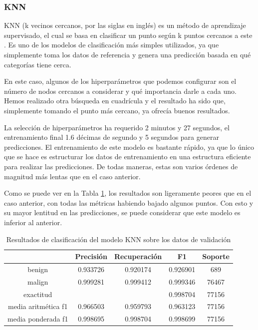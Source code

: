 \subsubsection{KNN}

KNN (k vecinos cercanos, por las siglas en inglés) es un método de aprendizaje supervisado, el cual se basa en clasificar un punto según k puntos cercanos a este \cite{ibmknn}. Es uno de los modelos de clasificación más simples utilizados, ya que simplemente toma los datos de referencia y genera una predicción basada en qué categorías tiene cerca.

En este caso, algunos de los hiperparámetros que podemos configurar son el número de nodos cercanos a considerar y qué importancia darle a cada uno. Hemos realizado otra búsqueda en cuadrícula y el resultado ha sido que, simplemente tomando el punto más cercano, ya ofrecía buenos resultados.

La selección de hiperparámetros ha requerido 2 minutos y 27 segundos, el entrenamiento final 1.6 décimas de segundo y 5 segundos para generar predicciones. El entrenamiento de este modelo es bastante rápido, ya que lo único que se hace es estructurar los datos de entrenamiento en una estructura eficiente para realizar las predicciones. De todas maneras, estas son varios órdenes de magnitud más lentas que en el caso anterior.

Como se puede ver en la Tabla \ref{table:knnresults}, los resultados son ligeramente peores que en el caso anterior, con todas las métricas habiendo bajado algunos puntos. Con esto y su mayor lentitud en las predicciones, se puede considerar que este modelo es inferior al anterior.

\begin{table}[H]
    \begin{center}
        \begin{tabular}{|c | c c c | c |} 
            \hline
            & \textbf{Precisión} & \textbf{Recuperación} & \textbf{F1}  & \textbf{Soporte} \\
            \hline
            benign               & 0.933726 & 0.920174 & 0.926901  &   689 \\
            malign               & 0.999281 & 0.999412 & 0.999346  & 76467 \\
            \hline
            exactitud            &          &          & 0.998704  & 77156 \\
            media aritmética f1  & 0.966503 & 0.959793 & 0.963123  & 77156 \\
            media ponderada f1   & 0.998695 & 0.998704 & 0.998699  & 77156 \\
            \hline
        \end{tabular}
    \end{center}
    \caption{Resultados de clasificación del modelo KNN sobre los datos de validación}
    \label{table:knnresults}
\end{table}

